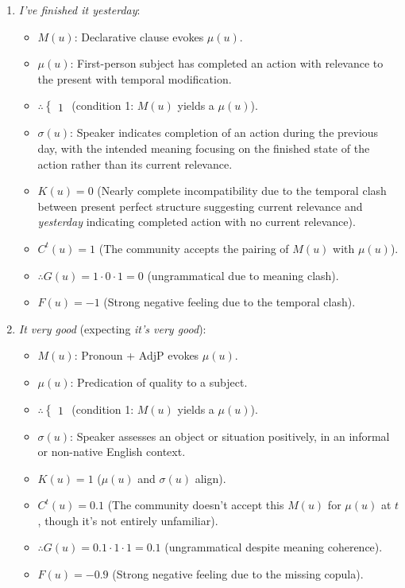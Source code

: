 \documentclass[12pt,letterpaper]{article}
\begin{document}
\begin{enumerate}
    \item \textit{I've finished it yesterday}:
    \begin{itemize}
        \item \(M(u)\): Declarative clause evokes \(\mu(u)\).
        \item \(\mu(u)\): First-person subject has completed an action with relevance to the present with temporal modification.
        \item \(\therefore \begin{cases} 1 \end{cases}\) (condition 1: \(M(u)\) yields a \(\mu(u)\)).
        \item \(\sigma(u)\): Speaker indicates completion of an action during the previous day, with the intended meaning focusing on the finished state of the action rather than its current relevance.
        \item \(K(u) = 0\) (Nearly complete incompatibility due to the temporal clash between present perfect structure suggesting current relevance and \textit{yesterday} indicating completed action with no current relevance).
        \item \(C^t(u) = 1\) (The community accepts the pairing of \(M(u)\) with \(\mu(u)\)).
        \item \(\therefore G(u) = 1 \cdot 0 \cdot 1 = 0\) (ungrammatical due to meaning clash).
        \item \(F(u) = -1\) (Strong negative feeling due to the temporal clash).
    \end{itemize}

    \item \textit{It very good} (expecting \textit{it's very good}):
    \begin{itemize}
        \item \(M(u)\): Pronoun + AdjP evokes \(\mu(u)\).
        \item \(\mu(u)\): Predication of quality to a subject.
        \item \(\therefore \begin{cases} 1 \end{cases}\) (condition 1: \(M(u)\) yields a \(\mu(u)\)).
        \item \(\sigma(u)\): Speaker assesses an object or situation positively, in an informal or non-native English context.
        \item \(K(u) = 1\) (\(\mu(u)\) and \(\sigma(u)\) align).
        \item \(C^t(u) = 0.1\) (The community doesn't accept this \(M(u)\) for \(\mu(u)\) at $t$, though it's not entirely unfamiliar).
        \item \(\therefore G(u) = 0.1 \cdot 1 \cdot 1 = 0.1\) (ungrammatical despite meaning coherence).
        \item \(F(u) = -0.9\) (Strong negative feeling due to the missing copula).
    \end{itemize}


\end{enumerate}
\end{document}
